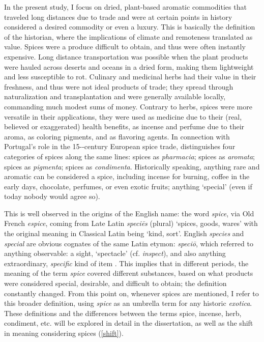 In the present study, I focus on dried, plant-based aromatic commodities that traveled long distances due to trade and were at certain points in history considered a desired commodity or even a luxury. This is basically the definition of the historian, where the implications of climate and remoteness translated as value. Spices were a produce difficult to obtain, and thus were often instantly expensive. Long distance transportation was possible when the plant products were hauled across deserts and oceans in a dried form, making them lightweight and less susceptible to rot. Culinary and medicinal herbs had their value in their freshness, and thus were not ideal products of trade; they spread through naturalization and transplantation and were generally available locally, commanding much modest sums of money. Contrary to herbs, spices were more versatile in their applications, they were used as medicine due to their (real, believed or exaggerated) health benefits, as incense and perfume due to their aroma, as coloring pigments, and as flavoring agents. In connection with Portugal's role in the 15--century European spice trade, \textcite{halikowski_smith_portugal_2001} distinguishes four categories of spices along the same lines: spices as \textit{pharmacia}; spices as \textit{aromata}; spices as \textit{pigmenta}; spices as \textit{condimenta}. Historically speaking, anything rare and aromatic can be considered a spice, including incense for burning, coffee in the early days, chocolate, perfumes, or even exotic fruits; anything `special' (even if today nobody would agree so).

This is well observed in the origins of the English name: the word \textit{spice}, via Old French \textit{espice}, coming from Late Latin \textit{speciēs} (plural) `spices, goods, wares' with the original meaning in Classical Latin being `kind, sort'. English \textit{species} and \textit{special} are obvious cognates of the same Latin etymon: \textit{speciō}, which referred to anything observable: a sight, `spectacle' (cf. \textit{inspect}), and also anything extraordinary, \textit{specific} kind of item \autocite[1983-84]{glare_oxford_2012}. This implies that in different periods, the meaning of the term \textit{spice} covered different substances, based on what products were considered special, desirable, and difficult to obtain; the definition constantly changed. From this point on, whenever spices are mentioned, I refer to this broader definition, using \textit{spice} as an umbrella term for any historic \textit{exotica}. These definitions and the differences between the terms spice, incense, herb, condiment, etc. will be explored in detail in the dissertation, as well as the shift in meaning considering spices (\cref{shift}).

